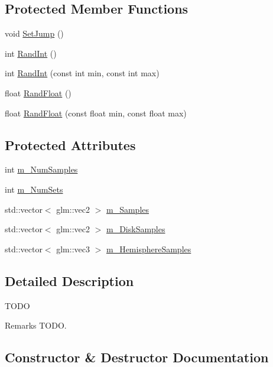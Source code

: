 \subsection*{Protected Member Functions}
\begin{DoxyCompactItemize}
\item 
void \hyperlink{class_sampler_adb58ad84344a6422c6d9096c7f1fabf6}{Set\+Jump} ()
\item 
int \hyperlink{class_sampler_ab0c3297a5b07875a6ddd4215b8aff7b4}{Rand\+Int} ()
\item 
int \hyperlink{class_sampler_a18b4fffc11fe530d4728d89843e975af}{Rand\+Int} (const int min, const int max)
\item 
float \hyperlink{class_sampler_a8adf80273672e0a196298f6d147b9551}{Rand\+Float} ()
\item 
float \hyperlink{class_sampler_ac2ce842ca9597948cbfd175232b5a7a6}{Rand\+Float} (const float min, const float max)
\end{DoxyCompactItemize}
\subsection*{Protected Attributes}
\begin{DoxyCompactItemize}
\item 
int \hyperlink{class_sampler_a8b2c214702841cc163f3cb2a2218284a}{m\+\_\+\+Num\+Samples}
\item 
int \hyperlink{class_sampler_a3a4c91f58f0ddb1d479ae476e689d71e}{m\+\_\+\+Num\+Sets}
\item 
std\+::vector$<$ glm\+::vec2 $>$ \hyperlink{class_sampler_adbc476f6d58621c0ce9173bbe1c53d70}{m\+\_\+\+Samples}
\item 
std\+::vector$<$ glm\+::vec2 $>$ \hyperlink{class_sampler_abb6650869ddaf8002831d257b1b8c426}{m\+\_\+\+Disk\+Samples}
\item 
std\+::vector$<$ glm\+::vec3 $>$ \hyperlink{class_sampler_afd09bd7c820d74c4d658cbef5cb46020}{m\+\_\+\+Hemisphere\+Samples}
\end{DoxyCompactItemize}


\subsection{Detailed Description}
T\+O\+DO \begin{DoxyRemark}{Remarks}
T\+O\+DO. 
\end{DoxyRemark}


\subsection{Constructor \& Destructor Documentation}
\hypertarget{class_sampler_a9682037ac10546714cfde073143cb0be}{}\label{class_sampler_a9682037ac10546714cfde073143cb0be} 
